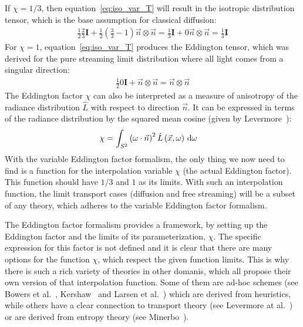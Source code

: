 If $\chi=1/3$, then equation~\ref{eq:iso_var_T} will result in the isotropic distribution tensor, which is the base assumption for classical diffusion:
\begin{align}
\frac{1}{2}\frac{2}{3}\mathbf{I} + \frac{1}{2}\left(\frac{3}{3}-1\right) \vec{n}\otimes\vec{n}
=\frac{1}{3}\mathbf{I} + 0\vec{n}\otimes\vec{n} = \frac{1}{3}\mathbf{I}
\end{align}
For $\chi=1$, equation~\ref{eq:iso_var_T} produces the Eddington tensor, which was derived for the pure streaming limit distribution where all light comes from a singular direction:
\begin{align}
\frac{1}{2}0\mathbf{I} + \vec{n}\otimes\vec{n}
= \vec{n}\otimes\vec{n}
\end{align}
The Eddington factor $\chi$ can also be interpreted as a measure of anisotropy of the radiance distribution $\widehat{L}$ with respect to direction $\vec{n}$. It can be expressed in terms of the radiance distribution by the squared mean cosine (given by Levermore~\cite{Levermore84}):
\begin{align}
\chi &= \int_{S^2}{ \left(\omega\cdot\vec{n}\right)^2\hat{L}\left(\vec{x}, \omega\right)\,\mathrm{d}\omega}
\label{eq:iso_var_chi}
\end{align}
With the variable Eddington factor formalism, the only thing we now need to find is a function for the interpolation variable $\chi$ (the actual Eddington factor). This function should have $1/3$ and $1$ as its limits. With such an interpolation function, the limit transport cases (diffusion and free streaming) will be a subset of any theory, which adheres to the variable Eddington factor formalism.

The Eddington factor formalism provides a framework, by setting up the Eddington factor and the limits of its parameterization, $\chi$. The specific expression for this factor is not defined and it is clear that there are many options for the function $\chi$, which respect the given function limits. This is why there is such a rich variety of theories in other domanis, which all propose their own version of that interpolation function. Some of them are ad-hoc schemes (see Bowers et al.~\cite{Bowers82}, Kershaw~\cite{Kershaw76} and Larsen et al.~\cite{Larsen74}) which are derived from heuristics, while others have a clear connection to transport theory (see Levermore at al.~\cite{Levermore81}) or are derived from entropy theory (see Minerbo~\cite{Minerbo78}).

